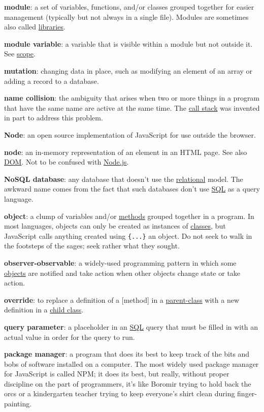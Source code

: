 \textbf{module}: a set of variables, functions, and/or classes grouped
together for easier management (typically but not always in a single
file). Modules are sometimes also called
\protect\hyperlink{g:library}{libraries}.

\textbf{module variable}: a variable that is visible within a module but
not outside it. See \protect\hyperlink{g:scope}{scope}.

\textbf{mutation}: changing data in place, such as modifying an element
of an array or adding a record to a database.

\textbf{name collision}: the ambiguity that arises when two or more
things in a program that have the same name are active at the same time.
The \protect\hyperlink{g:call-stack}{call stack} was invented in part to
address this problem.

\textbf{Node}: an open source implementation of JavaScript for use
outside the browser.

\textbf{node}: an in-memory representation of an element in an HTML
page. See also \protect\hyperlink{g:dom}{DOM}. Not to be confused with
\protect\hyperlink{g:node-js}{Node.js}.

\textbf{NoSQL database}: any database that doesn't use the
\protect\hyperlink{g:relational-database}{relational} model. The awkward
name comes from the fact that such databases don't use
\protect\hyperlink{g:sql}{SQL} as a query language.

\textbf{object}: a clump of variables and/or
\protect\hyperlink{g:method}{methods} grouped together in a program. In
most languages, objects can only be created as instances of
\protect\hyperlink{g:class}{classes}, but JavaScript calls anything
created using \texttt{\{...\}} an object. Do not seek to walk in the
footsteps of the sages; seek rather what they sought.

\textbf{observer-observable}: a widely-used programming pattern in which
some \protect\hyperlink{g:object}{objects} are notified and take action
when other objects change state or take action.

\textbf{override}: to replace a definition of a {[}method{]} in a
\protect\hyperlink{g:parent-class}{parent-class} with a new definition
in a \protect\hyperlink{g:child-class}{child class}.

\textbf{query parameter}: a placeholder in an
\protect\hyperlink{g:sql}{SQL} query that must be filled in with an
actual value in order for the query to run.

\textbf{package manager}: a program that does its best to keep track of
the bits and bobs of software installed on a computer. The most widely
used package manager for JavaScript is called NPM; it does its best, but
really, without proper discipline on the part of programmers, it's like
Boromir trying to hold back the orcs or a kindergarten teacher trying to
keep everyone's shirt clean during finger-painting.

